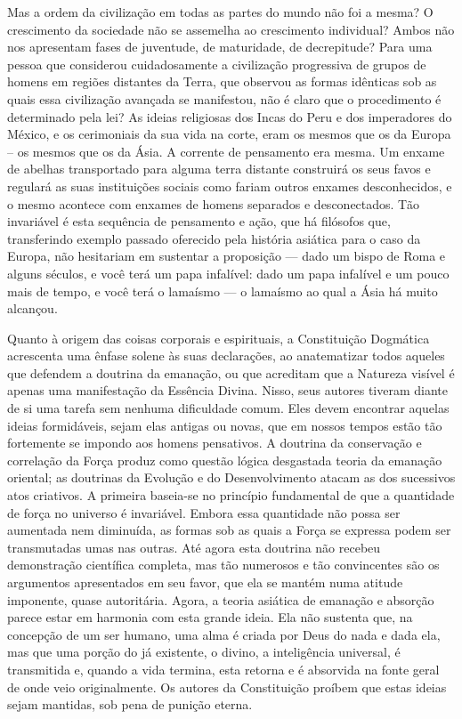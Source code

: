 \documentclass[11pt,a5paper,twoside,openany]{book}
\begin{document}
Mas a ordem da civilização em todas as partes do mundo não foi a mesma? O crescimento da sociedade não se assemelha ao crescimento individual? Ambos não nos apresentam fases de juventude, de maturidade, de decrepitude? Para uma pessoa que considerou cuidadosamente a civilização progressiva de grupos de homens em regiões distantes da Terra, que observou as formas idênticas sob as quais essa civilização avançada se manifestou, não é claro que o procedimento é determinado pela lei? As ideias religiosas dos Incas do Peru e dos imperadores do México, e os cerimoniais da sua vida na corte, eram os mesmos que os da Europa – os mesmos que os da Ásia. A corrente de pensamento era mesma. Um enxame de abelhas transportado para alguma terra distante construirá os seus favos e regulará as suas instituições sociais como fariam outros enxames desconhecidos, e o mesmo acontece com enxames de homens separados e desconectados. Tão invariável é esta sequência de pensamento e ação, que há filósofos que, transferindo exemplo passado oferecido pela história asiática para o caso da Europa, não hesitariam em sustentar a proposição — dado um bispo de Roma e alguns séculos, e você terá um papa infalível: dado um papa infalível e um pouco mais de tempo, e você terá o lamaísmo — o lamaísmo ao qual a Ásia há muito alcançou.

Quanto à origem das coisas corporais e espirituais, a Constituição Dogmática acrescenta uma ênfase solene às suas declarações, ao anatematizar todos aqueles que defendem a doutrina da emanação, ou que acreditam que a Natureza visível é apenas uma manifestação da Essência Divina. Nisso, seus autores tiveram diante de si uma tarefa sem nenhuma dificuldade comum. Eles devem encontrar aquelas ideias formidáveis, sejam elas antigas ou novas, que em nossos tempos estão tão fortemente se impondo aos homens pensativos. A doutrina da conservação e correlação da Força produz como questão lógica desgastada teoria da emanação oriental; as doutrinas da Evolução e do Desenvolvimento atacam as dos sucessivos atos criativos. A primeira baseia-se no princípio fundamental de que a quantidade de força no universo é invariável. Embora essa quantidade não possa ser aumentada nem diminuída, as formas sob as quais a Força se expressa podem ser transmutadas umas nas outras. Até agora esta doutrina não recebeu demonstração científica completa, mas tão numerosos e tão convincentes são os argumentos apresentados em seu favor, que ela se mantém numa atitude imponente, quase autoritária. Agora, a teoria asiática de emanação e absorção parece estar em harmonia com esta grande ideia. Ela não sustenta que, na concepção de um ser humano, uma alma é criada por Deus do nada e dada ela, mas que uma porção do já existente, o divino, a inteligência universal, é transmitida e, quando a vida termina, esta retorna e é absorvida na fonte geral de onde veio originalmente. Os autores da Constituição proíbem que estas ideias sejam mantidas, sob pena de punição eterna.
\end{document}
